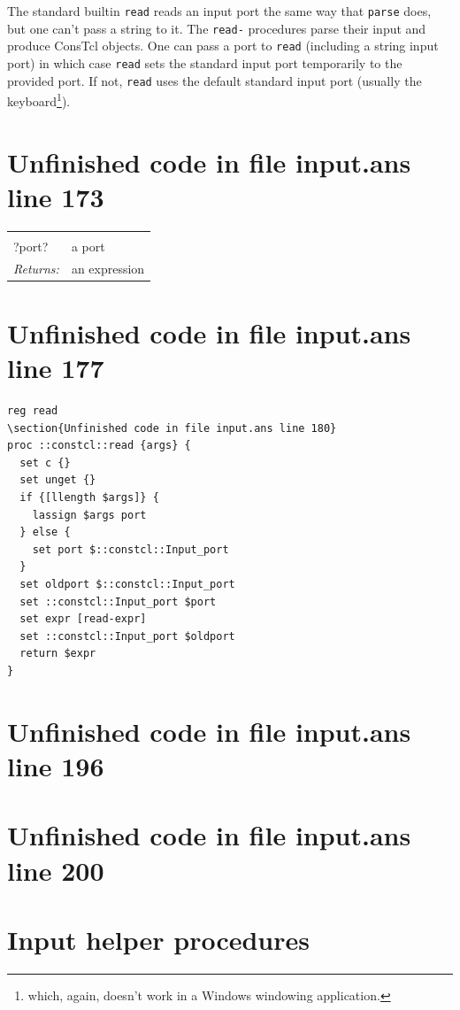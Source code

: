 \documentclass[twoside,9pt]{report}
\begin{document}
The standard builtin \texttt{read} reads an input port the same way that \texttt{parse} does, but one can't pass a string to it. The \texttt{read-} procedures parse their input and produce ConsTcl objects. One can pass a port to \texttt{read} (including a string input port) in which case \texttt{read} sets the standard input port temporarily to the provided port. If not, \texttt{read} uses the default standard input port (usually the keyboard\footnote{which, again, doesn't work in a Windows windowing application.}).

\section{Unfinished code in file input.ans line 173}
\noindent\begin{tabular}{ |p{1.9cm} p{8cm}| }
\hline
\rowcolor[HTML]{CCCCCC} \multicolumn{2}{|l|}{\bf read (public)} \\
?port? & a port \\
\textit{Returns:} & an expression \\
\hline
\end{tabular}
\section{Unfinished code in file input.ans line 177}
\begin{lstlisting}
reg read
\section{Unfinished code in file input.ans line 180}
proc ::constcl::read {args} {
  set c {}
  set unget {}
  if {[llength $args]} {
    lassign $args port
  } else {
    set port $::constcl::Input_port
  }
  set oldport $::constcl::Input_port
  set ::constcl::Input_port $port
  set expr [read-expr]
  set ::constcl::Input_port $oldport
  return $expr
}
\end{lstlisting}
\section{Unfinished code in file input.ans line 196}
\section{Unfinished code in file input.ans line 200}
\section{Input helper procedures}
\label{input-helper-procedures}
\end{document}
